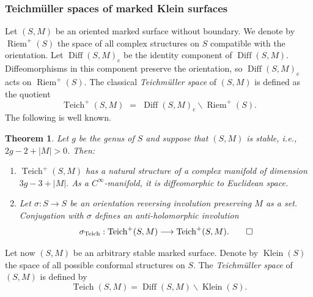 \documentclass[english,11pt,leqno]{article}
\def\on{\operatorname}
\def\lra{\longrightarrow}
\def\Klein{\on{Klein}}
\def\Riem{\on{Riem}}
\def\Teich{\on{Teich}}
\def\Diff{\on{Diff}}
\newtheorem{thm}{Theorem}[section]
\theoremstyle{definition}
\theoremstyle{remark}
\numberwithin{equation}{section}
\begin{document}
\subsubsection{Teichm\"uller spaces of marked Klein surfaces}

Let $(S,M)$ be an oriented marked surface without boundary. We denote by $\Riem^+(S)$ the space of
all complex structures on $S$ compatible with the orientation.
Let $\Diff(S,M)_e$ be the identity component of $\Diff(S,M)$. Diffeomorphisms in this component
preserve the orientation, so $\Diff(S,M)_e$ acts on $\Riem^+(S)$. The classical
{\em Teichm\"uller space} of $(S,M)$ is defined as the quotient
\[
\Teich^+(S,M) \,\,=\,\, \Diff(S,M)_e \backslash \Riem^+(S). 
\]
The following is well known. 

\begin{thm}
Let $g$ be the genus of $S$ and suppose that $(S,M)$ is stable, i.e., $2g-2+|M|>0$. Then:
\begin{enumerate}
\item[(a)] $\Teich^+(S,M)$ has a natural structure of a complex manifold of dimension $3g-3+|M|$. As
a $C^\infty$-manifold, it is diffeomorphic to Euclidean space. 

\item[(b)] Let $\sigma:S\to S$ be an orientation reversing involution preserving $M$ as a set. Conjugation
with $\sigma$ defines an anti-holomorphic involution
\[
\sigma_{\Teich}: \Teich^+(S,M) \lra \Teich^+(S,M). \qed
\]

\end{enumerate}
\end{thm}


Let now $(S,M)$ be an arbitrary stable marked surface. Denote by $\Klein(S)$ the space of all
possible conformal structures on $S$. The {\em Teichm\"uller space}
of $(S,M)$ is defined by
\[
\Teich(S,M) = \Diff(S,M)\backslash \Klein(S). 
\]
\end{document}
